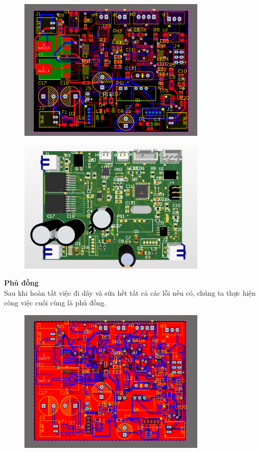 \begin{figure}[H]
    \centering
    \includegraphics[width=0.8\textwidth]{pictures/7h.png}
\end{figure}
\begin{figure}[H]
    \centering
    \includegraphics[width=0.8\textwidth]{pictures/7i.png}
\end{figure}
\cleardoublepage
\textbf{Phủ đồng} \\
\hspace*{0.7cm}Sau khi hoàn tất việc đi dây và sửa hết tất cả các lỗi nếu có, chúng ta thực hiện công việc cuối cùng là phủ đồng.
\begin{figure}[H]
    \centering
    \includegraphics[width=0.8\textwidth]{pictures/7j.png}
\end{figure}
